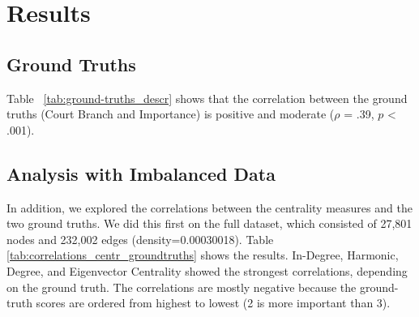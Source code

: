 \documentclass[sigconf]{acmart}
\begin{document}
\section{Results}

\subsection{Ground Truths}
Table ~\ref{tab:ground-truths_descr} shows that the correlation between the ground truths (Court Branch and Importance) is positive and moderate ($\rho$ = .39, $p$ < .001).


\begin{table}[t]
\centering
\renewcommand{\arraystretch}{1.2}
\caption{Court Branch and merged Importance Score frequencies.}
\label{tab:ground-truths_descr}
\end{table}



\subsection{Analysis with Imbalanced Data}

In addition, we explored the correlations between the centrality measures and the two ground truths. We did this first on the full dataset, which consisted of 27,801 nodes and 232,002 edges (density=0.00030018). Table \ref{tab:correlations_centr_groundtruths} shows the results. In-Degree, Harmonic, Degree, and Eigenvector Centrality showed the strongest correlations, depending on the ground truth. The correlations are mostly negative because the ground-truth scores are ordered from highest to lowest (2 is more important than 3).
\end{document}
